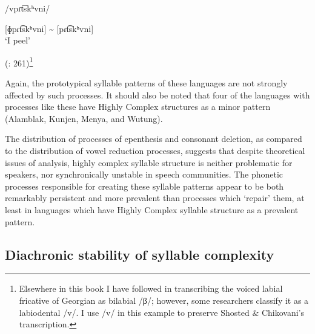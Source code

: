 \ea\label{ex:8.8}

/vpɾt͡skʰvni/

[ɸpɾt͡skʰvni] {\textasciitilde} [pɾt͡skʰvni]\\
\glt ‘I peel’

(\citealt{ShostedChikovani2006}: 261)\footnote{{Elsewhere in this book I have followed \citet{Aronson1991} in transcribing the voiced labial fricative of Georgian as bilabial /β/; however, some researchers classify it as a labiodental /v/. I use /v/ in this example to preserve Shosted \& Chikovani’s transcription.}}
\z

Again, the prototypical syllable patterns of these languages are not strongly affected by such processes. It should also be noted that four of the languages with processes like these have Highly Complex structures as a minor pattern (Alamblak, Kunjen, Menya, and Wutung).

  The distribution of processes of epenthesis and consonant deletion, as compared to the distribution of vowel reduction processes, suggests that despite theoretical issues of analysis, highly complex syllable structure is neither problematic for speakers, nor synchronically unstable in speech communities. The phonetic processes responsible for creating these syllable patterns appear to be both remarkably persistent and more prevalent than processes which ‘repair’ them, at least in languages which have Highly Complex syllable structure as a prevalent pattern.

\subsection{Diachronic stability of syllable complexity}\label{sec:8.5.2}

